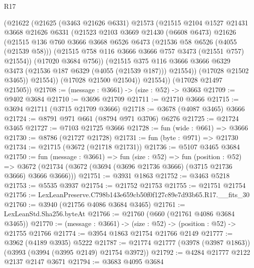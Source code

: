 \begin{lexlean}{R17}
\begin{coremodule}
              (@21622
                (@21625
                  (@3463 @21626 @6331)
                  @21573
                  (@21515
                    @2104
                    @1527
                    @21431
                    @3668
                    @21626
                    @6331
                    (@21523
                      @2103
                      @3669
                      @21430
                      (@6608 @6473)
                      @21626
                      (@21515
                        @136
                        @760
                        @3666
                        @3668
                        @6526
                        @6473
                        (@21536 @58 @6526 (@4055 (@21539 @58)))
                        (@21515 @758 @116 @3666 @3666 @757 @3473 (@21551 @757) @21554))
                      (@17020 @3684 @756))
                    (@21515
                      @375
                      @116
                      @3666
                      @3666
                      @6329
                      @3473
                      (@21536 @187 @6329 (@4055 (@21539 @187)))
                      @21554))
                  (@17028 @21502 @3465))
                @21554))
            (@17028 @21500 @21504))
          @21554))
      (@17028 @21497 @21505))
@21708 := (message : @3661) -> (size : @52) -> @3663
@21709 := @9402 @3684
@21710 := @3696 @21709
@21711 := @21710 @3666
@21715 := @3694 @21711 (@3715 @21709 @3666)
@21718 := @3678 (@4087 @3465) @3666
@21724 := @8791 @971 @661 (@8794 @971 @3706) @6276
@21725 := @21724 @3465
@21727 := @7103 @21725 @3666
@21728 := fun (wide : @661) => @3666
@21730 := @8786 (@21727 @21728)
@21731 := fun (byte : @971) => @21730
@21734 := @21715 (@3672 (@21718 @21731))
@21736 := @5107 @3465 @3684
@21750 := fun (message : @3661) =>
  fun (size : @52) =>
  fun (position : @52) =>
  @3672 (@21734 (@3672 (@3694 (@3696 @21736 @3666) (@3715 @21736 @3666) @3666 @3666)))
@21751 := @3931 @1863
@21752 := @3463 @5218
@21753 := @5535 @3937
@21754 := @21752 @21753
@21755 := @21751 @21754
@21756 := LexLeanPreserve.C798b143e659cb50f0f127c89e7d93b65.R17.__fits_30
@21760 := @3940 (@21756 @4086 @3684 @3465)
@21761 := LexLeanStd.Sha256.byteAt
@21766 := @21760 (@660 (@21761 @4086 @3684 @3465))
@21770 := (message : @3661) -> (size : @52) -> (position : @52) -> @21755 @21766
@21774 := @3954 @1863 @21754 @21766 @2149
@21777 := @3962 (@4189 @3935) @5222
@21787 := @21774 @21777 (@3978 (@3987 @1863)) (@3993 (@3994 (@3995 @2149) @21754 @3972))
@21792 := @4284 @21777 @2122 @2137 @2147 @3671
@21794 := @3683 @4095 @3684

\end{coremodule}
\end{lexlean}
